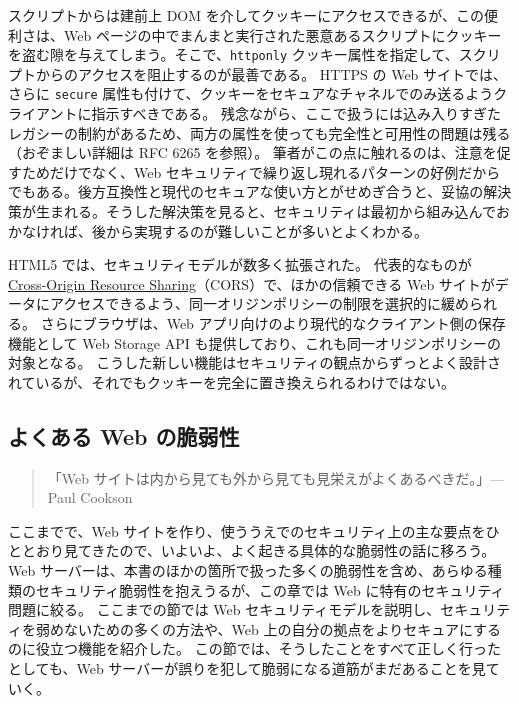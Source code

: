 \documentclass[uplatex]{jsarticle}
\def\label#1{}%
\begin{document}
\begin{rem}\label{rem:ch11-cookie-attributes}
スクリプトからは建前上 DOM を介してクッキーにアクセスできるが、この便利さは、Web ページの中でまんまと実行された悪意あるスクリプトにクッキーを盗む隙を与えてしまう。そこで、\texttt{httponly} クッキー属性を指定して、スクリプトからのアクセスを阻止するのが最善である。
HTTPS の Web サイトでは、さらに \texttt{secure} 属性も付けて、クッキーをセキュアなチャネルでのみ送るようクライアントに指示すべきである。
残念ながら、ここで扱うには込み入りすぎたレガシーの制約があるため、両方の属性を使っても完全性と可用性の問題は残る（おぞましい詳細は RFC 6265 を参照）。
筆者がこの点に触れるのは、注意を促すためだけでなく、Web セキュリティで繰り返し現れるパターンの好例だからでもある。後方互換性と現代のセキュアな使い方とがせめぎ合うと、妥協の解決策が生まれる。そうした解決策を見ると、セキュリティは最初から組み込んでおかなければ、後から実現するのが難しいことが多いとよくわかる。
\end{rem}

HTML5 では、セキュリティモデルが数多く拡張された。
代表的なものが \underline{Cross-Origin Resource Sharing}（CORS）で、ほかの信頼できる Web サイトがデータにアクセスできるよう、同一オリジンポリシーの制限を選択的に緩められる。
さらにブラウザは、Web アプリ向けのより現代的なクライアント側の保存機能として Web Storage API も提供しており、これも同一オリジンポリシーの対象となる。
こうした新しい機能はセキュリティの観点からずっとよく設計されているが、それでもクッキーを完全に置き換えられるわけではない。

\subsection{よくある Web の脆弱性}\label{subsec:ch11-common-vulns}

\begin{quote}
「Web サイトは内から見ても外から見ても見栄えがよくあるべきだ。」\hfill --- Paul Cookson
\end{quote}

ここまでで、Web サイトを作り、使ううえでのセキュリティ上の主な要点をひととおり見てきたので、いよいよ、よく起きる具体的な脆弱性の話に移ろう。
Web サーバーは、本書のほかの箇所で扱った多くの脆弱性を含め、あらゆる種類のセキュリティ脆弱性を抱えうるが、この章では Web に特有のセキュリティ問題に絞る。
ここまでの節では Web セキュリティモデルを説明し、セキュリティを弱めないための多くの方法や、Web 上の自分の拠点をよりセキュアにするのに役立つ機能を紹介した。
この節では、そうしたことをすべて正しく行ったとしても、Web サーバーが誤りを犯して脆弱になる道筋がまだあることを見ていく。
\end{document}
